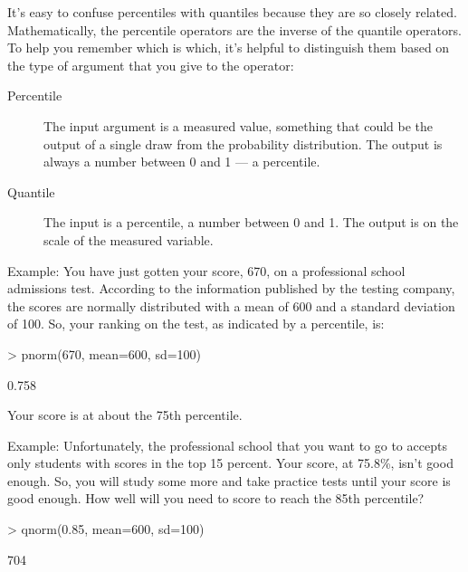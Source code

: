 It's easy to confuse percentiles with quantiles because they are so
closely related.
Mathematically, the percentile operators are the inverse of the
quantile operators. 
To help you remember which is which, it's helpful to distinguish them
based on the type of argument that you give to the operator:
\begin{description}
\item[Percentile] The input 
argument is a measured value, something that could be the
output of a single draw from the probability distribution. The output
is always a number between 0 and 1 --- a percentile. 

\item[Quantile] The input is a percentile, a number between 0 and 1.
The output is on the scale of the measured variable.
\end{description}


Example:  You have just gotten your score, 670, on a professional school
admissions test.  According to the information published by the
testing company, the scores are normally distributed with a mean of
600 and a standard deviation of 100.  So, your ranking on the test, as
indicated by a percentile, is:
\begin{Schunk}
\begin{Sinput}
> pnorm(670, mean=600, sd=100)
\end{Sinput}
\begin{Soutput}
[1] 0.758
\end{Soutput}
\end{Schunk}
Your score is at about the 75th percentile.  

Example: Unfortunately, the professional school that you want to go to
accepts only students with scores in the top 15 percent.  Your score,
at 75.8\%, isn't good enough.  So, you will study some more and take
practice tests until your score is good enough.
How well will you need to score to reach the 85th percentile?
\begin{Schunk}
\begin{Sinput}
> qnorm(0.85, mean=600, sd=100)
\end{Sinput}
\begin{Soutput}
[1] 704
\end{Soutput}
\end{Schunk}


